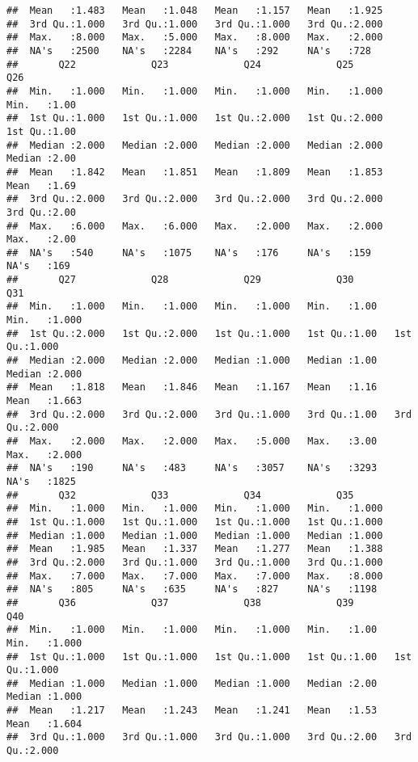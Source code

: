 \documentclass[
]{article}
\begin{document}
\begin{verbatim}
##  Mean   :1.483   Mean   :1.048   Mean   :1.157   Mean   :1.925  
##  3rd Qu.:1.000   3rd Qu.:1.000   3rd Qu.:1.000   3rd Qu.:2.000  
##  Max.   :8.000   Max.   :5.000   Max.   :8.000   Max.   :2.000  
##  NA's   :2500    NA's   :2284    NA's   :292     NA's   :728    
##       Q22             Q23             Q24             Q25             Q26      
##  Min.   :1.000   Min.   :1.000   Min.   :1.000   Min.   :1.000   Min.   :1.00  
##  1st Qu.:1.000   1st Qu.:1.000   1st Qu.:2.000   1st Qu.:2.000   1st Qu.:1.00  
##  Median :2.000   Median :2.000   Median :2.000   Median :2.000   Median :2.00  
##  Mean   :1.842   Mean   :1.851   Mean   :1.809   Mean   :1.853   Mean   :1.69  
##  3rd Qu.:2.000   3rd Qu.:2.000   3rd Qu.:2.000   3rd Qu.:2.000   3rd Qu.:2.00  
##  Max.   :6.000   Max.   :6.000   Max.   :2.000   Max.   :2.000   Max.   :2.00  
##  NA's   :540     NA's   :1075    NA's   :176     NA's   :159     NA's   :169   
##       Q27             Q28             Q29             Q30            Q31       
##  Min.   :1.000   Min.   :1.000   Min.   :1.000   Min.   :1.00   Min.   :1.000  
##  1st Qu.:2.000   1st Qu.:2.000   1st Qu.:1.000   1st Qu.:1.00   1st Qu.:1.000  
##  Median :2.000   Median :2.000   Median :1.000   Median :1.00   Median :2.000  
##  Mean   :1.818   Mean   :1.846   Mean   :1.167   Mean   :1.16   Mean   :1.663  
##  3rd Qu.:2.000   3rd Qu.:2.000   3rd Qu.:1.000   3rd Qu.:1.00   3rd Qu.:2.000  
##  Max.   :2.000   Max.   :2.000   Max.   :5.000   Max.   :3.00   Max.   :2.000  
##  NA's   :190     NA's   :483     NA's   :3057    NA's   :3293   NA's   :1825   
##       Q32             Q33             Q34             Q35       
##  Min.   :1.000   Min.   :1.000   Min.   :1.000   Min.   :1.000  
##  1st Qu.:1.000   1st Qu.:1.000   1st Qu.:1.000   1st Qu.:1.000  
##  Median :1.000   Median :1.000   Median :1.000   Median :1.000  
##  Mean   :1.985   Mean   :1.337   Mean   :1.277   Mean   :1.388  
##  3rd Qu.:2.000   3rd Qu.:1.000   3rd Qu.:1.000   3rd Qu.:1.000  
##  Max.   :7.000   Max.   :7.000   Max.   :7.000   Max.   :8.000  
##  NA's   :805     NA's   :635     NA's   :827     NA's   :1198   
##       Q36             Q37             Q38             Q39            Q40       
##  Min.   :1.000   Min.   :1.000   Min.   :1.000   Min.   :1.00   Min.   :1.000  
##  1st Qu.:1.000   1st Qu.:1.000   1st Qu.:1.000   1st Qu.:1.00   1st Qu.:1.000  
##  Median :1.000   Median :1.000   Median :1.000   Median :2.00   Median :1.000  
##  Mean   :1.217   Mean   :1.243   Mean   :1.241   Mean   :1.53   Mean   :1.604  
##  3rd Qu.:1.000   3rd Qu.:1.000   3rd Qu.:1.000   3rd Qu.:2.00   3rd Qu.:2.000  

\end{verbatim}
\end{document}
